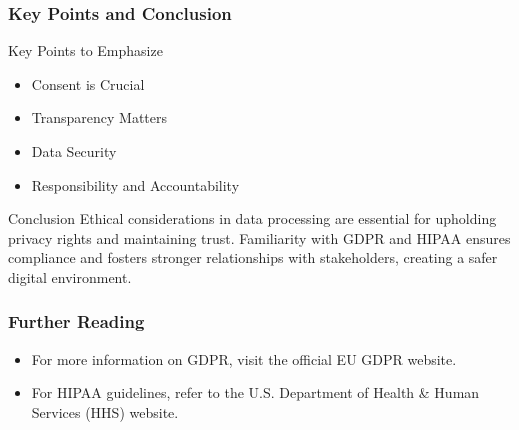 \documentclass[aspectratio=169]{beamer}
\begin{document}
\begin{frame}[fragile]
    \frametitle{Key Points and Conclusion}
    \begin{block}{Key Points to Emphasize}
        \begin{itemize}
            \item Consent is Crucial
            \item Transparency Matters
            \item Data Security
            \item Responsibility and Accountability
        \end{itemize}
    \end{block}
    \begin{block}{Conclusion}
        Ethical considerations in data processing are essential for upholding privacy rights and maintaining trust. Familiarity with GDPR and HIPAA ensures compliance and fosters stronger relationships with stakeholders, creating a safer digital environment.
    \end{block}
\end{frame}

\begin{frame}[fragile]
    \frametitle{Further Reading}
    \begin{itemize}
        \item For more information on GDPR, visit the official EU GDPR website.
        \item For HIPAA guidelines, refer to the U.S. Department of Health \& Human Services (HHS) website.
    \end{itemize}
\end{frame}
\end{document}
